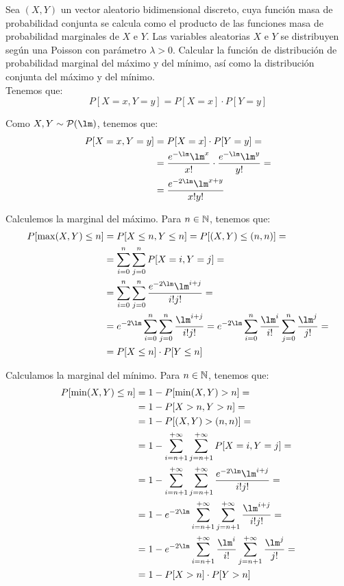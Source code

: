 \begin{ejercicio}
    Sea $(X,Y)$ un vector aleatorio bidimensional discreto, cuya función masa de probabilidad conjunta se calcula como el producto de las funciones masa de probabilidad marginales de $X$ e $Y$. Las variables aleatorias $X$ e $Y$ se distribuyen según una Poisson con parámetro $\lambda>0$. Calcular la función de distribución de probabilidad marginal del máximo y del mínimo, así como la distribución conjunta del máximo y del mínimo.\\

    Tenemos que:
    \begin{equation*}
        P[X=x,Y=y] = P[X=x]\cdot P[Y=y]
    \end{equation*}

    Como $X,Y\sim \cc{P}(\lm)$, tenemos que:
    \begin{align*}
        P[X=x,Y=y]&=P[X=x]\cdot P[Y=y]
        =\\&= \dfrac{e^{-\lm}\lm^x}{x!}\cdot \dfrac{e^{-\lm}\lm^y}{y!}
        =\\&= \dfrac{e^{-2\lm}\lm^{x+y}}{x!y!}
    \end{align*}

    Calculemos la marginal del máximo. Para $n\in \mathbb{N}$, tenemos que:
    \begin{align*}
        P[\max(X,Y)\leq n]&=P[X\leq n,Y\leq n]
        = P[(X,Y)\leq (n,n)]
        =\\&= \sum_{i=0}^{n}\sum_{j=0}^{n}P[X=i,Y=j]
        =\\&= \sum_{i=0}^{n}\sum_{j=0}^{n}\dfrac{e^{-2\lm}\lm^{i+j}}{i!j!}
        =\\&= e^{-2\lm}\sum_{i=0}^{n}\sum_{j=0}^{n}\dfrac{\lm^{i+j}}{i!j!}
        = e^{-2\lm}\sum_{i=0}^{n}\dfrac{\lm^i}{i!}\sum_{j=0}^{n}\dfrac{\lm^j}{j!}
        =\\&= P[X\leq n]\cdot P[Y\leq n]
    \end{align*}

    Calculamos la marginal del mínimo. Para $n\in \mathbb{N}$, tenemos que:
    \begin{align*}
        P[\min(X,Y)\leq n]&=1-P[\min(X,Y)>n]
        =\\&= 1-P[X>n,Y>n]
        =\\&= 1-P[(X,Y)>(n,n)]
        =\\&= 1-\sum_{i=n+1}^{+\infty}\sum_{j=n+1}^{+\infty}P[X=i,Y=j]
        =\\&= 1-\sum_{i=n+1}^{+\infty}\sum_{j=n+1}^{+\infty}\dfrac{e^{-2\lm}\lm^{i+j}}{i!j!}
        =\\&= 1-e^{-2\lm}\sum_{i=n+1}^{+\infty}\sum_{j=n+1}^{+\infty}\dfrac{\lm^{i+j}}{i!j!}
        =\\&= 1-e^{-2\lm}\sum_{i=n+1}^{+\infty}\dfrac{\lm^i}{i!}\sum_{j=n+1}^{+\infty}\dfrac{\lm^j}{j!}
        =\\&= 1-P[X>n]\cdot P[Y>n]
    \end{align*}


\end{ejercicio}
